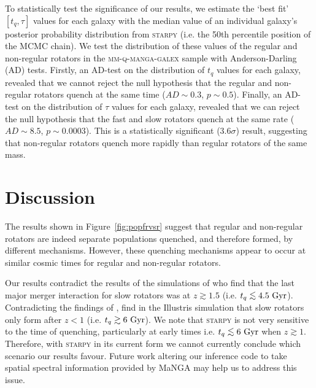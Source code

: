 \documentclass[useAMS,usenatbib]{mn2e}
\def\lesssim{\mathrel{\hbox{\rlap{\hbox{\lower3pt\hbox{$\sim$}}}\hbox{\raise2pt\hbox{$<$}}}}}
\begin{document}
To statistically test the significance of our results, we estimate the `best fit' $[t_q, \tau]$ values for each galaxy with the median value of an individual galaxy's posterior probability distribution from \textsc{starpy} (i.e. the 50th percentile position of the MCMC chain). We test the distribution of these values of the regular and non-regular rotators in the \textsc{mm-q-manga-galex} sample with Anderson-Darling (AD) tests. Firstly, an AD-test on the distribution of $t_q$ values for each galaxy, revealed that we cannot reject the null hypothesis that the regular and non-regular rotators quench at the same time ($AD\sim 0.3$, $p \sim 0.5$). Finally, an AD-test on the distribution of $\tau$ values for each galaxy, revealed that we can reject the null hypothesis that the fast and slow rotators quench at the same rate ($AD\sim 8.5$, $p \sim 0.0003$). This is a statistically significant ($3.6\sigma$) result, suggesting that non-regular rotators quench more rapidly than regular rotators of the same mass.


\section{Discussion}\label{sec:discussion}

The results shown in Figure~\ref{fig:popfrvsr} suggest that regular and non-regular rotators are indeed separate populations quenched, and therefore formed, by different mechanisms. However, these quenching mechanisms appear to occur at similar cosmic times for regular and non-regular rotators.

Our results contradict the results of the simulations of \cite{khochfar11} who find that the last major merger interaction for slow rotators was at $z \gtrsim 1.5$ (i.e. $t_q \lesssim 4.5~\rm{Gyr}$). Contradicting the findings of \citeauthor{khochfar11}, \cite{penoyre17} find in the Illustris simulation that slow rotators only form after $z < 1$ (i.e. $t_q \gtrsim 6~\rm{Gyr}$). We note that \textsc{starpy} is not very sensitive to the time of quenching, particularly at early times i.e. $t_q \lesssim 6~\rm{Gyr}$ when $z \gtrsim 1$. Therefore, with \textsc{starpy} in its current form we cannot currently conclude which scenario our results favour. Future work altering our inference code to take spatial spectral information provided by MaNGA may help us to address this issue.

\end{document}
